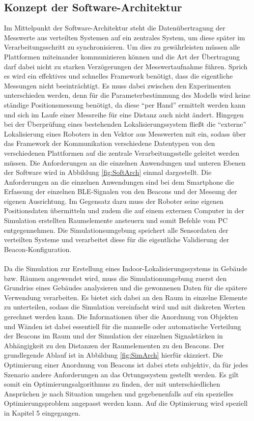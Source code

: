 \subsection{Konzept der Software-Architektur}
Im Mittelpunkt der Software-Architektur steht die Datenübertragung der Messwerte aus verteilten Systemen auf ein zentrales System, um diese später im Verarbeitungsschritt zu synchronisieren. Um dies zu gewährleisten müssen alle Plattformen miteinander kommunizieren können und die Art der Übertragung darf dabei nicht zu starken Verzögerungen der Messwertaufnahme führen. Sprich es wird ein effektives und schnelles Framework benötigt, dass die eigentliche Messungen nicht beeinträchtigt. Es muss dabei zwischen den Experimenten unterschieden werden, denn für die Parameterbestimmung des Modells wird keine ständige Positionsmessung benötigt, da diese "`per Hand"' ermittelt werden kann und sich im Laufe einer Messreihe für eine Distanz auch nicht ändert. Hingegen bei der Überprüfung eines bestehenden Lokalisierungssystem fließt die "`externe"' Lokalisierung eines Roboters in den Vektor aus Messwerten mit ein, sodass über das Framework der Kommunikation verschiedene Datentypen von den verschiedenen Plattformen auf die zentrale Verarbeitungsstelle geleitet werden müssen. Die Anforderungen an die einzelnen Anwendungen und unteren Ebenen der Software wird in Abbildung \ref{fig:SoftArch} einmal dargestellt. Die Anforderungen an die einzelnen Anwendungen sind bei dem Smartphone die Erfassung der einzelnen BLE-Signalen von den Beacons und der Messung der eigenen Ausrichtung. Im Gegensatz dazu muss der Roboter seine eigenen Positionsdaten übermitteln und zudem die auf einem externen Computer in der Simulation erstellten Raumelemente ansteuern und somit Befehle vom PC entgegennehmen. Die Simulationsumgebung speichert alle Sensordaten der verteilten Systeme und verarbeitet diese für die eigentliche Validierung der Beacon-Konfiguration. \\ \\
Da die Simulation zur Erstellung eines Indoor-Lokalisierungssystems in Gebäude bzw. Räumen angewendet wird, muss die Simulationumgebung zuerst den Grundriss eines Gebäudes analysieren und die gewonnenen Daten für die spätere Verwendung verarbeiten. Es bietet sich dabei an den Raum in einzelne Elemente zu unterteilen, sodass die Simulation vereinfacht wird und mit diskreten Werten gerechnet werden kann. Die Informationen über die Anordnung von Objekten und Wänden ist dabei essentiell für die manuelle oder automatische Verteilung der Beacons im Raum und der Simulation der einzelnen Signalstärken in Abhängigkeit zu den Distanzen der Raumelementen zu den Beacons. Der grundlegende Ablauf ist in Abbildung \ref{fig:SimArch} hierfür skizziert. Die Optimierung einer Anordnung von Beacons ist dabei stets subjektiv, da für jedes Szenario andere Anforderungen an das Ortungssystem gestellt werden. Es gilt somit ein Optimierungsalgorithmus zu finden, der mit unterschiedlichen Ansprüchen je nach Situation umgehen und gegebenenfalls auf ein spezielles Optimierungsproblem angepasst werden kann. Auf die Optimierung wird speziell in Kapitel 5 eingegangen.
